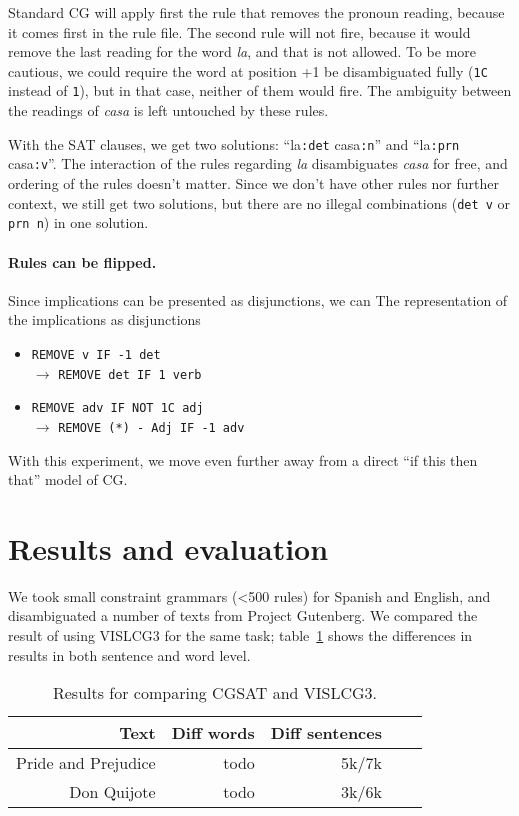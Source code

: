 \documentclass[11pt]{article}
\begin{document}
Standard CG will apply first the rule that removes the pronoun reading, because it comes first in the rule file.
The second rule will not fire, because it would remove the last reading for the word \emph{la}, and that is not allowed. To be more cautious, we could require the word at position +1 be disambiguated fully (\texttt{1C} instead of \texttt{1}), but in that case, neither of them would fire. The ambiguity between the readings of \emph{casa} is left untouched by these rules.

With the SAT clauses, we get two solutions: ``la\texttt{:det} casa\texttt{:n}''  and ``la\texttt{:prn} casa\texttt{:v}''. The interaction of the rules regarding \emph{la}  disambiguates \emph{casa} for free, and ordering of the rules doesn't matter. Since we don't have other rules nor further context, we still get two solutions, but there are no illegal combinations (\texttt{det v} or \texttt{prn n}) in one solution.

\paragraph{Rules can be flipped.}
Since implications can be presented as disjunctions, we can 
The representation of the implications as disjunctions 
\begin{itemize}
\item [] \texttt{REMOVE v IF -1 det} \\ $\rightarrow$ \texttt{REMOVE det IF 1 verb}   
\item [] \texttt{REMOVE adv IF NOT 1C adj} \\ $\rightarrow$ \texttt{REMOVE (*) - Adj  IF -1 adv}  \\
\end{itemize}

With this experiment, we move even further away from a direct ``if this then that'' model of CG.

\section{Results and evaluation}

We took small constraint grammars (\textless{}500 rules) for Spanish and English, and disambiguated a number of texts from Project Gutenberg. We compared the result of using VISLCG3 for the same task; table~\ref{table:results} shows the differences in results in both sentence and word level.

\begin{table}
  \centering
  \begin{tabular}{|r|r|r|r|r|}
     \hline
    \textbf{Text} & \textbf{Diff words} & \textbf{Diff sentences} \\
    \hline
	Pride and Prejudice & todo & 5k/7k \\  
    \hline
       Don Quijote & todo & 3k/6k  \\ 
     \hline
  \end{tabular}
  \caption{Results for comparing CGSAT and VISLCG3.}
  \label{table:results}
\end{table}
\end{document}
